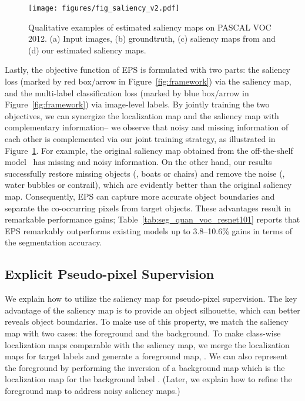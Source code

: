 \documentclass[final]{cvpr}
\begin{document}
\begin{figure}[t]
\centering
\texttt{[image: figures/fig\_saliency\_v2.pdf]}
\caption{Qualitative examples of estimated saliency maps on PASCAL VOC 2012. (a) Input images, (b) groundtruth, (c) saliency maps from \cite{zhao2019pyramid} and (d) our estimated saliency maps.} \vspace{-2mm}
\label{fig:sal}
\end{figure} 
Lastly, the objective function of EPS is formulated with two parts: {the saliency loss}  (marked by red box/arrow in Figure~\ref{fig:framework}) via the saliency map, and {the multi-label classification loss}  (marked by blue box/arrow in Figure~\ref{fig:framework}) via image-level labels. By jointly training the two objectives, we can synergize the localization map and the saliency map with complementary information-- we observe that noisy and missing information of each other is complemented via our joint training strategy, as illustrated in Figure~\ref{fig:sal}. For example, the original saliency map obtained from the off-the-shelf model~\cite{hou2017deeply,nguyen2019deepusps,zhao2019pyramid} has missing and noisy information. On the other hand, our results successfully restore missing objects (\eg, boats or chairs) and remove the noise (\eg, water bubbles or contrail), which are evidently better than the original saliency map. Consequently, EPS can capture more accurate object boundaries and separate the co-occurring pixels from target objects. These advantages result in remarkable performance gains; Table~\ref{tab:seg_quan_voc_resnet101} reports that EPS remarkably outperforms existing models up to 3.8--10.6\% gains in terms of the segmentation accuracy.


\subsection{Explicit Pseudo-pixel Supervision}\label{section3.2}

We explain how to utilize the saliency map for pseudo-pixel supervision. The key advantage of the saliency map is to provide an object silhouette, which can better reveals object boundaries. To make use of this property, we match the saliency map with two cases: the foreground and the background. To make class-wise localization maps comparable with the saliency map, we merge the localization maps for target labels and generate a foreground map, . We can also represent the foreground by performing the inversion of a background map which is the localization map for the background label . (Later, we explain how to refine the foreground map to address noisy saliency maps.) 
\end{document}
